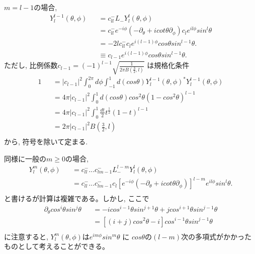 \documentclass[11pt,a4paper]{jsarticle}
\begin{document}
$m=l-1$の場合, 
\begin{eqnarray}
Y_l^{l-1} (\theta,\phi) &&= c^-_{ll} L_- Y_l^l(\theta,\phi) \nonumber \\
&&=c^-_{ll} e^{-i\phi} (-\partial_\theta+icot\theta \partial_\phi)c_l e^{il\phi} sin^l \theta \nonumber \\
&&=- 2l  c^-_{ll} c_l e^{i(l-1)\phi} cos \theta sin^{l-1} \theta. \nonumber \\
&&\equiv c_{l-1} e^{i(l-1)\phi} cos \theta sin^{l-1} \theta. 
\end{eqnarray}
ただし, 比例係数$c_{l-1}=(-1)^{l-1}\sqrt{\frac{1}{2\pi B(\frac{3}{2}, l)}}$ は規格化条件
\begin{eqnarray}
1 &&= |c_{l-1}|^2 \int_0^{2\pi}d\phi  \int_{-1}^{1} d(cos\theta) Y_l^{l-1}(\theta,\phi)^* Y_l^{l-1}(\theta,\phi)\nonumber \\
&&= 4\pi  |c_{l-1}|^2 \int_{0}^{1} d(cos\theta) cos^2\theta (1-cos^2\theta)^{l-1} \nonumber \\
&&= 4\pi  |c_{l-1}|^2 \int_{0}^{1}  \frac{dt}{2}t^{\frac{1}{2}} (1-t)^{l-1} \nonumber \\
&&= 2\pi  |c_{l-1}|^2 B(\frac{3}{2}, l) \nonumber \\
\end{eqnarray}
から, 符号を除いて定まる.  

同様に一般の$m\ge0$の場合, 
\begin{eqnarray}
Y_l^m (\theta,\phi) &&= c^-_{ll} ... c^-_{lm-1} L_-^{l-m} Y_l^l(\theta,\phi) \nonumber \\
&&=c^-_{ll}...c^-_{lm-1} c_l  [e^{-i\phi} (-\partial_\theta+icot\theta \partial_\phi)]^{l-m} e^{il\phi} sin^l \theta. \nonumber \\
\end{eqnarray}
と書けるが計算は複雑である。しかし, ここで
\begin{eqnarray}
\partial_\theta cos^i \theta sin^j \theta &&= - i cos^{i-1} \theta sin^{j+1} \theta + j cos^{i+1} \theta sin^{j-1} \theta \nonumber \\
&&= [ (i+j)cos^2 \theta -i  ] cos^{i-1} \theta sin^{j-1} \theta \nonumber \\
\end{eqnarray}
に注意すると, $Y_l^m (\theta,\phi)$は$e^{im\phi} sin^m \theta$ に $cos \theta$の$(l-m)$次の多項式がかかったものとして考えることができる。
\end{document}
